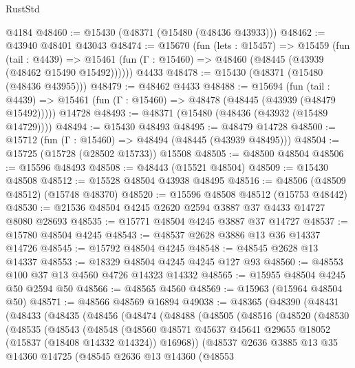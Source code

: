\begin{lexlean}{RustStd}
\begin{coremodule}
{\begin{coremodule}
{{{{{{{{{{{{{{{{{{{{{{{{{{{{{{{{{{{{{{{{{{{{{{{{{{{{{{{{{{{{    @4184
@48460 := @15430 (@48371 (@15480 (@48436 @43933)))
@48462 := @43940 @48401 @43043
@48474 := @15670
    (fun (lets : @15457) =>
    @15459
      (fun (tail : @4439) =>
      @15461 (fun (Γ : @15460) => @48460 (@48445 (@43939 (@48462 @15490 @15492))))))
    @4433
@48478 := @15430 (@48371 (@15480 (@48436 @43955)))
@48479 := @48462 @4433
@48488 := @15694
    (fun (tail : @4439) => @15461 (fun (Γ : @15460) => @48478 (@48445 (@43939 (@48479 @15492)))))
    @14728
@48493 := @48371 (@15480 (@48436 (@43932 (@15489 @14729))))
@48494 := @15430 @48493
@48495 := @48479 @14728
@48500 := @15712 (fun (Γ : @15460) => @48494 (@48445 (@43939 @48495)))
@48504 := @15725 (@15728 (@28502 @15733)) @15508
@48505 := @48500 @48504
@48506 := @15596 @48493
@48508 := @48443 (@15521 @48504)
@48509 := @15430 @48508
@48512 := @15528 @48504 @43938 @48495
@48516 := @48506 (@48509 @48512) (@15748 @48370)
@48520 := @15596 @48508 @48512 (@15753 @48442)
@48530 := @21536 @48504 @4245 @2620 @2594 @3887 @37 @4433 @14727 @8080 @28693
@48535 := @15771 @48504 @4245 @3887 @37 @14727
@48537 := @15780 @48504 @4245
@48543 := @48537 @2628 @3886 @13 @36 @14337 @14726
@48545 := @15792 @48504 @4245
@48548 := @48545 @2628 @13 @14337
@48553 := @18329 @48504 @4245 @4245 @127 @93
@48560 := @48553 @100 @37 @13 @4560 @4726 @14323 @14332
@48565 := @15955 @48504 @4245 @50 @2594 @50
@48566 := @48565 @4560
@48569 := @15963 (@15964 @48504 @50)
@48571 := @48566 @48569 @16894
@49038 := @48365
    (@48390
      (@48431
        (@48433
          (@48435
            (@48456
              (@48474
                (@48488
                  (@48505
                    (@48516
                      (@48520
                        (@48530
                          (@48535
                            (@48543
                              (@48548
                                (@48560
                                  @48571
                                  @45637
                                  @45641
                                  @29655
                                  @18052
                                  (@15837 (@18408 @14332 @14324))
                                  @16968))
                              (@48537
                                @2636
                                @3885
                                @13
                                @35
                                @14360
                                @14725
                                (@48545
                                  @2636
                                  @13
                                  @14360
                                  (@48553
}}}}}}}}}}}}}}}}}}}}}}}}}}}}}}}}}}}}}}}}}}}}}}}}}}}}}}}}}}}}
\end{coremodule}}
\end{coremodule}
\end{lexlean}
